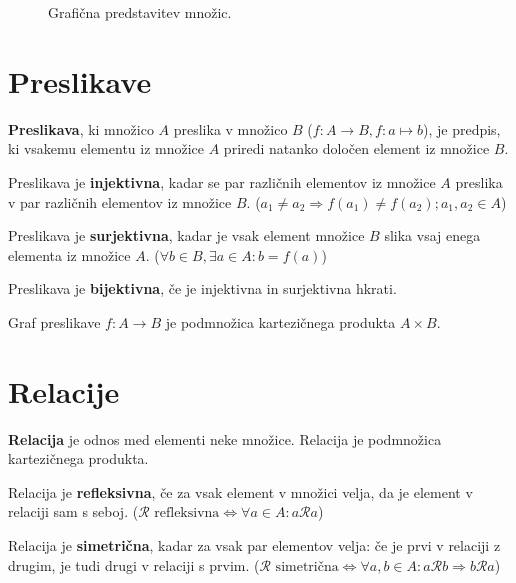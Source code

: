 \documentclass[a4paper,oneside,12pt,fleqn]{article}
\newcommand{\Rel}{\mathcal{R}}
\newcommand{\beforecaptionskip}{\vspace{-12pt}}
\renewcommand\implies\Rightarrow
\renewcommand\iff\Leftrightarrow
\numberwithin{equation}{section}
\begin{document}
\begin{figure}[h]
  \begin{center}
    \hspace{2em}
  \end{center}
  \beforecaptionskip
  \caption{Grafična predstavitev množic.}
  \label{fig:mnoz}
\end{figure}

\section{Preslikave}
\label{sec:preslikave}
\textbf{Preslikava}, ki množico $A$ preslika v množico $B$ ($f\colon A \rightarrow B,
f\colon a \mapsto b$), je predpis, ki vsakemu elementu iz
množice $A$ priredi natanko določen element iz množice $B$.

Preslikava je \textbf{injektivna}, kadar se par različnih elementov iz množice $A$ preslika v par
različnih elementov iz množice $B$. ($a_1 \neq a_2 \implies f(a_1) \neq f(a_2); a_1, a_2
\in A$)

Preslikava je \textbf{surjektivna}, kadar je vsak element množice $B$ slika vsaj enega elementa iz
množice $A$. ($\forall b \in B, \exists a \in A\colon b = f(a)$)

Preslikava je \textbf{bijektivna}, če je injektivna in surjektivna hkrati.

Graf preslikave $f\colon A \rightarrow B$ je podmnožica kartezičnega produkta $A \times B$.

\section{Relacije}
\label{sec:relacije}
\textbf{Relacija} je odnos med elementi neke množice.
Relacija je podmnožica kartezičnega produkta.

Relacija je \textbf{refleksivna}, če za vsak element v množici velja, da je element v relaciji sam s
seboj. ($\Rel \text{ refleksivna} \iff \forall a \in A\colon a \Rel a$)

Relacija je \textbf{simetrična}, kadar za vsak par elementov velja: če je prvi v relaciji z drugim,
je tudi drugi v relaciji s prvim.
($\Rel \text{ simetrična} \iff \forall a, b \in A\colon a \Rel b \implies b \Rel a$)
\end{document}
